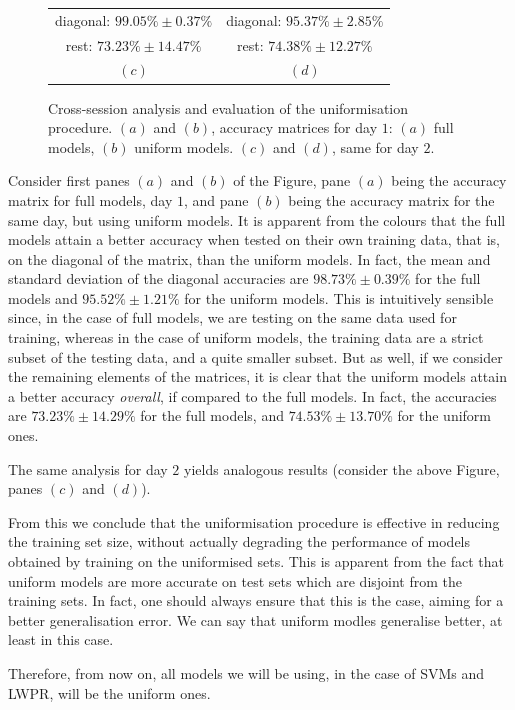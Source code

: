 \begin{figure}[!ht]
\begin{tabular}{cc}
    diagonal: $99.05\% \pm 0.37\%$ & diagonal: $95.37\% \pm 2.85\%$ \\
        rest: $73.23\% \pm 14.47\%$ & rest: $74.38\% \pm 12.27\%$ \\
    $(c)$ & $(d)$ \\
  \end{tabular}
  \caption{Cross-session analysis and evaluation of the uniformisation
    procedure. $(a)$ and $(b)$, accuracy matrices for day $1$: $(a)$
    full models, $(b)$ uniform models. $(c)$ and $(d)$, same for day $2$.}
  \label{fig:cross_initial}
\end{figure}

Consider first panes $(a)$ and $(b)$ of the Figure, pane $(a)$ being
the accuracy matrix for full models, day $1$, and pane $(b)$ being the
accuracy matrix for the same day, but using uniform models. It is
apparent from the colours that the full models attain a better
accuracy when tested on their own training data, that is, on the
diagonal of the matrix, than the uniform models. In fact, the mean and
standard deviation of the diagonal accuracies are $98.73\% \pm 0.39\%$
for the full models and $95.52\% \pm 1.21\%$ for the uniform
models. This is intuitively sensible since, in the case of full
models, we are testing on the same data used for training, whereas in
the case of uniform models, the training data are a strict subset of
the testing data, and a quite smaller subset. But as well, if we
consider the remaining elements of the matrices, it is clear that the
uniform models attain a better accuracy \emph{overall}, if compared to
the full models. In fact, the accuracies are $73.23\% \pm 14.29\%$ for
the full models, and $74.53\% \pm 13.70\%$ for the uniform ones.

The same analysis for day $2$ yields analogous results (consider the
above Figure, panes $(c)$ and $(d)$).

From this we conclude that the uniformisation procedure is effective
in reducing the training set size, without actually degrading the
performance of models obtained by training on the uniformised
sets. This is apparent from the fact that uniform models are more
accurate on test sets which are disjoint from the training sets. In
fact, one should always ensure that this is the case, aiming for a
better generalisation error. We can say that uniform modles generalise
better, at least in this case.

Therefore, from now on, all models we will be using, in the case of
SVMs and LWPR, will be the uniform ones.

